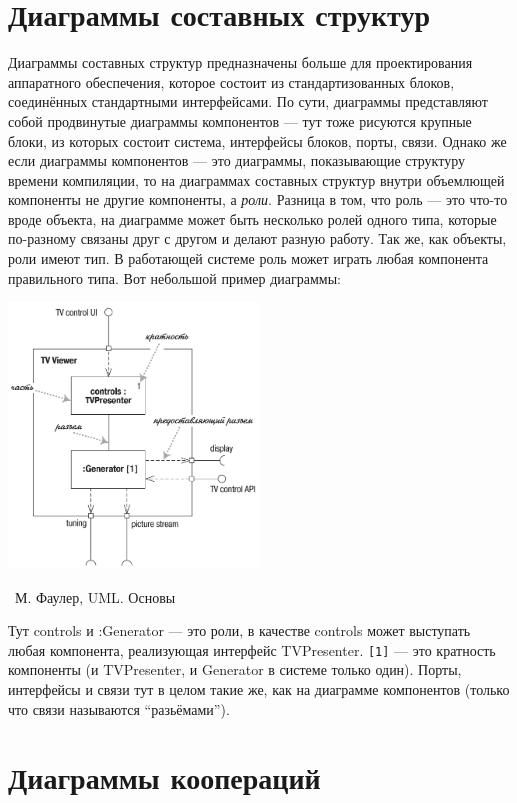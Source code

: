 \documentclass[a5paper]{article}
\newcommand{\attribution}[1] {
	\vspace{-5mm}\begin{flushright}\begin{scriptsize}%
	{\textcopyright\, #1}\end{scriptsize}\end{flushright}
}
\begin{document}
\section{Диаграммы составных структур}

Диаграммы составных структур предназначены больше для проектирования аппаратного обеспечения, которое состоит из стандартизованных блоков, соединённых стандартными интерфейсами. По сути, диаграммы представляют собой продвинутые диаграммы компонентов --- тут тоже рисуются крупные блоки, из которых состоит система, интерфейсы блоков, порты, связи. Однако же если диаграммы компонентов --- это диаграммы, показывающие структуру времени компиляции, то на диаграммах составных структур внутри объемлющей компоненты не другие компоненты, а \textit{роли}. Разница в том, что роль --- это что-то вроде объекта, на диаграмме может быть несколько ролей одного типа, которые по-разному связаны друг с другом и делают разную работу. Так же, как объекты, роли имеют тип. В работающей системе роль может играть любая компонента правильного типа. Вот небольшой пример диаграммы:

\begin{center}
	\includegraphics[width=0.5\textwidth]{compositeStructureDiagram.png}
	\attribution{М. Фаулер, UML. Основы}
\end{center}

Тут controls и :Generator --- это роли, в качестве controls может выступать любая компонента, реализующая интерфейс TVPresenter. \verb|[1]| --- это кратность компоненты (и TVPresenter, и Generator в системе только один). Порты, интерфейсы и связи тут в целом такие же, как на диаграмме компонентов (только что связи называются ``разьёмами'').

\section{Диаграммы коопераций}
\end{document}
